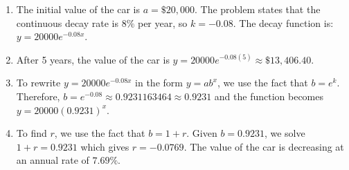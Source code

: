 \begin{solution}
    \begin{enumerate}
        \item The initial value of the car is \( a = \$20,000 \). The problem states that the continuous decay rate is \( 8\% \) per year, so \( k = -0.08 \). The decay function is: \( y = 20000e^{-0.08x} \).

        \item After 5 years, the value of the car is \( y = 20000e^{-0.08(5)} \approx \$13,406.40 \).

        \item To rewrite \( y = 20000e^{-0.08x} \) in the form \( y = ab^x \), we use the fact that \( b = e^k \). Therefore, \( b = e^{-0.08} \approx 0.9231163464 \approx 0.9231 \) and the function becomes \( y = 20000(0.9231)^x \).

        \item To find \( r \), we use the fact that \( b = 1 + r \). Given \( b = 0.9231 \), we solve \( 1 + r = 0.9231 \) which gives \( r = -0.0769 \). The value of the car is decreasing at an annual rate of \( 7.69\% \).
    \end{enumerate}
\end{solution}